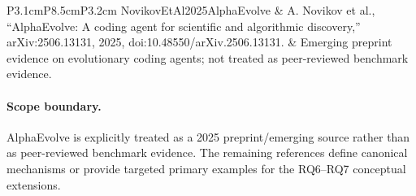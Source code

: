 \documentclass[9pt]{article}
\begin{document}
\begin{longtable}{P{3.1cm}P{8.5cm}P{3.2cm}}
NovikovEtAl2025AlphaEvolve & A. Novikov et al., ``AlphaEvolve: A coding agent for scientific and algorithmic discovery,'' arXiv:2506.13131, 2025, doi:10.48550/arXiv.2506.13131. & Emerging preprint evidence on evolutionary coding agents; not treated as peer-reviewed benchmark evidence.\\
\bottomrule
\end{longtable}

\paragraph{Scope boundary.}
AlphaEvolve is explicitly treated as a 2025 preprint/emerging source rather than as peer-reviewed benchmark evidence. The remaining references define canonical mechanisms or provide targeted primary examples for the RQ6--RQ7 conceptual extensions.
\end{document}
